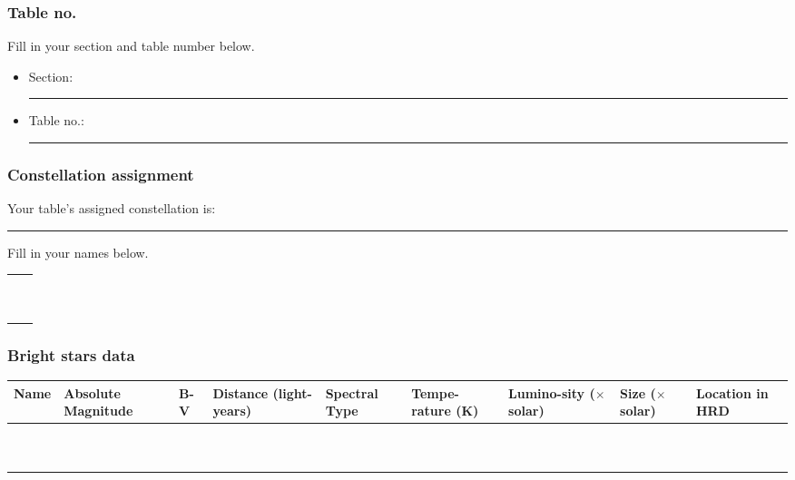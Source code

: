 \documentclass[main.tex]{subfiles}
\begin{document}
\subsubsection{Table no.}
Fill in your section and table number below.
\begin{itemize}
\item Section: \rule{2cm}{.15mm}
\item Table no.: \rule{2cm}{.15mm}
\end{itemize}

\subsubsection{Constellation assignment}
Your table's assigned constellation is: \rule{5cm}{.15mm}

Fill in your names below.
\begin{table}[h!]
\begin{center}
\begin{tabular}{|p{8cm}|p{8cm}|}\hline
&\\
&\\\hline
&\\
&\\\hline
&\\
&\\\hline
&\\
&\\\hline
&\\
&\\\hline
\end{tabular}
\end{center}
\label{tab:name}
\end{table}
\newpage
\subsubsection{Bright stars data}
\begin{table}[h!]
\begin{center}
\begin{tabular}{|p{1.5cm}|p{1.5cm}|p{1cm}|p{1.5cm}|p{1.5cm}|p{1.5cm}|p{1.5cm}|p{1.5cm}|p{1.5cm}|}\hline
Name & Absolute Magnitude & B-V & Distance (light-years) & Spectral Type & Tempe-rature (K) & Lumino-sity ($\times$ solar) & Size ($\times$ solar) & Location in HRD \\\hline
&&&&&&&&\\\hline
&&&&&&&&\\\hline
&&&&&&&&\\\hline
&&&&&&&&\\\hline
&&&&&&&&\\\hline
&&&&&&&&\\\hline
&&&&&&&&\\\hline
&&&&&&&&\\\hline
&&&&&&&&\\\hline
&&&&&&&&\\\hline
\end{tabular}
\end{center}
\label{tab:star}
\end{table}%
\end{document}
